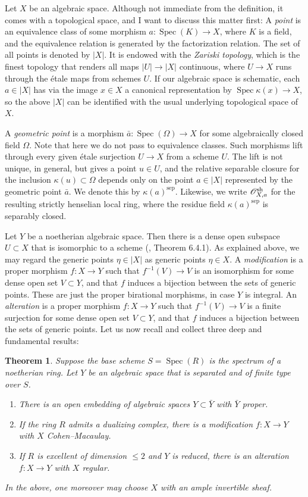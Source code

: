 \documentclass[oneside, 12pt]{amsart}
\newcommand\mylabel[1]{\label{#1}\marginpar{\vspace{-1ex}\medskip\medskip\footnotesize \tt #1}}
\renewcommand\mylabel[1]{\label{#1}}
\newtheorem{theorem}{Theorem}[section]
\theoremstyle{definition}
\theoremstyle{remark}
\renewcommand{\O}{\mathscr{O}}
\newcommand{\ra}{\rightarrow}
\newcommand{\sep}{{\operatorname{sep}}}
\newcommand{\sh}{{\text{\rm sh}}}
\newcommand{\Spec}{\operatorname{Spec}}
\begin{document}
Let $X$ be an algebraic space. Although  not immediate from the definition, it comes with 
a topological space, and I want to discuss this matter  first:
A \emph{point}   is an equivalence class of some morphism $a:\Spec(K)\ra X$, where $K$ is a field, and the equivalence relation is 
generated by the factorization relation.
The set of all points is denoted by  $|X|$. It is endowed with the \emph{Zariski topology}, which  is the finest topology that renders 
all maps $|U|\ra |X|$ continuous, where $U\ra X$ runs through the \'etale maps from schemes $U$. 
If  our algebraic space is  schematic,   each $a\in|X|$ has via the image $x\in X$  a canonical representation  by $\Spec\kappa(x)\ra X$,
so the above  $|X|$ can be identified with the usual underlying topological space of $X$.

A \emph{geometric point} is a morphism $\bar{a}:\Spec(\Omega)\ra X$ for some algebraically closed field $\Omega$.
Note that here we do not pass to equivalence classes.
Such  morphisms lift  through every given \'etale surjection $U\ra X$ from a scheme $U$. The lift is not unique, in general, but  gives a point $u\in U$,
and the relative separable closure for the inclusion  $\kappa(u)\subset\Omega$ depends only on the point $a\in |X|$ represented
by the geometric point $\bar{a}$. We denote this by  $\kappa(a)^\sep$. Likewise, we write $\O_{X,a}^\sh$ for the
resulting strictly henselian local ring, where the residue field    $\kappa(a)^\sep$ is separably closed.

Let $Y$ be a noetherian algebraic space. Then there is a dense open subspace  $U\subset X$ that is isomorphic to a scheme
(\cite{Olsson 2016}, Theorem 6.4.1).  As explained above,   we may regard the generic points   $\eta\in |X|$ as generic points $\eta\in X$.
A \emph{modification} is a proper morphism $f:X\ra Y$ such that $f^{-1}(V)\ra V$ is an isomorphism
for some dense open set $V\subset Y$, and that $f$ induces a bijection between the sets of generic points.
These are just the proper birational morphisms, in case $Y$ is integral.
An \emph{alteration} is a proper morphism $f:X\ra Y$ such that $f^{-1}(V)\ra V$ is a finite surjection for some dense open set $V\subset Y$,
and that $f$ induces a bijection between the sets of generic points.
Let us now recall and collect three     deep  and     fundamental results:

\begin{theorem}
\mylabel{fundamental results}
Suppose the base scheme  $S=\Spec(R)$ is the spectrum of a noetherian ring.
Let $Y$ be an algebraic space that is separated and of finite type over $S$.
\begin{enumerate}
\item There is an open  embedding of algebraic spaces $Y\subset\bar{Y}$ with $\bar{Y}$ proper.
\item If the ring $R$ admits a dualizing complex, there is a modification $f:X\ra Y$ with  $X$ Cohen--Macaulay.
\item If $R$ is excellent of dimension $\leq 2$ and $Y$ is reduced, there is an alteration $f:X\ra Y$ with $X$  regular.
\end{enumerate}
In the above, one moreover may choose $X$ with an ample invertible sheaf.
\end{theorem}
\end{document}
